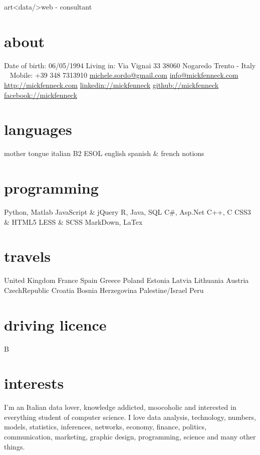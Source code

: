 \documentclass[]{friggeri-cv}
\begin{document}
       {art<data/>web - consultant}


\begin{aside}
  \section{about}
    Date of birth:
    06/05/1994
    Living in:
    Via Vignai 33
    38060 Nogaredo
    Trento - Italy
    ~
    Mobile: +39 348 7313910
    \href{mailto:michele.sordo@gmail.com}{michele.sordo@gmail.com}
    \href{mailto:info@mickfenneck.com}{info@mickfenneck.com}
    \href{http://mickfenneck.com}{http://mickfenneck.com}
    \href{http://linkedin.com/in/mickfenneck}{linkedin://mickfenneck}
    \href{http://github.com/mickfenneck}{github://mickfenneck}
    \href{http://facebook.com/mickfenneck}{facebook://mickfenneck}
  \section{languages}
    mother tongue italian
    B2 ESOL english
    spanish \& french notions
  \section{programming}
    Python, Matlab
    JavaScript \& jQuery
    R, Java, SQL
    C\#, Asp.Net
    C++, C
    CSS3 \& HTML5
    LESS \& SCSS
    MarkDown, LaTex
\section{travels}
    United Kingdom
    France
    Spain
    Greece
    Poland
    Estonia
    Latvia
    Lithuania
    Austria
    CzechRepublic
    Croatia
    Bosnia Herzegovina
    Palestine/Israel
    Peru
\section{driving licence}
    B
\end{aside}






\section{interests}
I'm an Italian data lover, knowledge addicted, moocoholic and interested in everything student of computer science.
I love data analysis, technology, numbers, models, statistics, inferences, networks, economy, finance, politics, communication, marketing, graphic design, programming, science and many other things.
\end{document}
